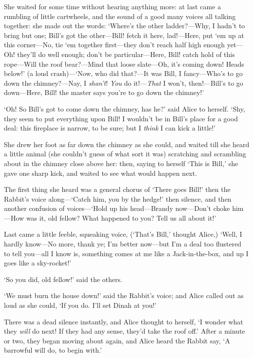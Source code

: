\documentclass[12pt,openany]{memoir}
\begin{document}
She waited for some time without hearing anything more: at last came a rumbling of little cartwheels, and the sound of a good many voices all talking together: she made out the words: `Where's the other ladder?---Why, I hadn't to bring but one; Bill's got the other---Bill! fetch it here, lad!---Here, put `em up at this corner---No, tie `em together first---they don't reach half high enough yet---Oh! they'll do well enough; don't be particular---Here, Bill! catch hold of this rope---Will the roof bear?---Mind that loose slate---Oh, it's coming down! Heads below!' (a loud crash)---`Now, who did that?---It was Bill, I fancy---Who's to go down the chimney?---Nay, I \textit{shan't}! \textit{You} do it!---\textit{That} I won't, then!---Bill's to go down---Here, Bill! the master says you're to go down the chimney!'

`Oh! So Bill's got to come down the chimney, has he?' said Alice to herself. `Shy, they seem to put everything upon Bill! I wouldn't be in Bill's place for a good deal: this fireplace is narrow, to be sure; but I \textit{think} I can kick a little!'

She drew her foot as far down the chimney as she could, and waited till she heard a little animal (she couldn't guess of what sort it was) scratching and scrambling about in the chimney close above her: then, saying to herself `This is Bill,' she gave one sharp kick, and waited to see what would happen next.

The first thing she heard was a general chorus of `There goes Bill!' then the Rabbit's voice along---`Catch him, you by the hedge!' then silence, and then another confusion of voices---`Hold up his head---Brandy now---Don't choke him---How was it, old fellow? What happened to you? Tell us all about it!'

Last came a little feeble, squeaking voice, (`That's Bill,' thought Alice,) `Well, I hardly know---No more, thank ye; I'm better now---but I'm a deal too flustered to tell you---all I know is, something comes at me like a Jack-in-the-box, and up I goes like a sky-rocket!'

`So you did, old fellow!' said the others.

`We must burn the house down!' said the Rabbit's voice; and Alice called out as loud as she could, `If you do. I'll set Dinah at you!'

There was a dead silence instantly, and Alice thought to herself, `I wonder what they \textit{will} do next! If they had any sense, they'd take the roof off.' After a minute or two, they began moving about again, and Alice heard the Rabbit say, `A barrowful will do, to begin with.'
\end{document}
